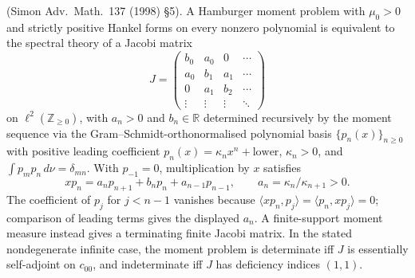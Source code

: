 \begin{theorem}
\label{v4-arith:hpvbconv:thm:simon-jacobi}
(Simon Adv.~Math.~137 (1998) \S5). A
Hamburger moment problem with \(\mu_0>0\) and strictly positive
Hankel forms on every nonzero polynomial is equivalent to the spectral theory of a Jacobi matrix
\[
J=\begin{pmatrix}b_{0}&a_{0}&0&\cdots\\ a_{0}&b_{1}&a_{1}&\cdots\\
0&a_{1}&b_{2}&\cdots\\ \vdots&\vdots&\vdots&\ddots\end{pmatrix}
\]
on \(\ell^{2}(\mathbb{Z}_{\geq 0})\), with \(a_{n}>0\) and \(b_{n}\in\mathbb{R}\)
determined recursively by the moment sequence via the
Gram--Schmidt-orthonormalised polynomial basis
\(\{p_n(x)\}_{n\ge0}\) with positive leading coefficient
\(p_n(x)=\kappa_nx^n+\text{lower}\), \(\kappa_n>0\), and
\(\int p_mp_n\,d\nu=\delta_{mn}\). With \(p_{-1}=0\),
multiplication by \(x\) satisfies
\[
 xp_n=a_np_{n+1}+b_np_n+a_{n-1}p_{n-1},\qquad
 a_n=\kappa_n/\kappa_{n+1}>0.
\]
The coefficient of \(p_j\) for \(j<n-1\) vanishes because
\(\langle xp_n,p_j\rangle=\langle p_n,xp_j\rangle=0\);
comparison of leading terms gives the displayed \(a_n\).
A finite-support moment measure instead gives a terminating finite
Jacobi matrix. In the stated nondegenerate infinite case, the moment problem is
determinate iff \(J\) is essentially self-adjoint on \(c_{00}\), and
indeterminate iff \(J\) has deficiency indices \((1,1)\).
\end{theorem}

